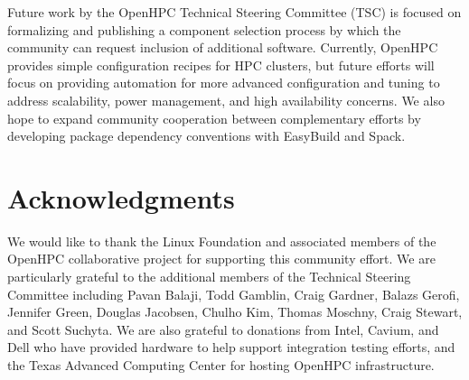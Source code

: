 \documentclass{sig-alternate-05-2015}
\begin{document}
Future work by the OpenHPC Technical Steering Committee (TSC) is focused on
formalizing and publishing a component selection process by which the community
can request inclusion of additional software. Currently, OpenHPC provides simple
configuration recipes for HPC clusters, but future efforts will focus on
providing automation for more advanced configuration and tuning to address
scalability, power management, and high availability concerns. We also hope to
expand community cooperation between complementary efforts by
developing package dependency conventions with EasyBuild and Spack.

\section{Acknowledgments}

We would like to thank the Linux Foundation and associated members of the
OpenHPC collaborative project for supporting this community effort.  We are
particularly grateful to the additional members of the Technical Steering
Committee including Pavan Balaji, Todd Gamblin, Craig Gardner, Balazs Gerofi,
Jennifer Green, Douglas Jacobsen, Chulho Kim, Thomas Moschny, Craig Stewart,
and Scott Suchyta.
We are also grateful to donations
from Intel, Cavium, and Dell who have provided hardware to help support integration testing
efforts, and the Texas Advanced Computing Center for hosting OpenHPC infrastructure.




\end{document}
